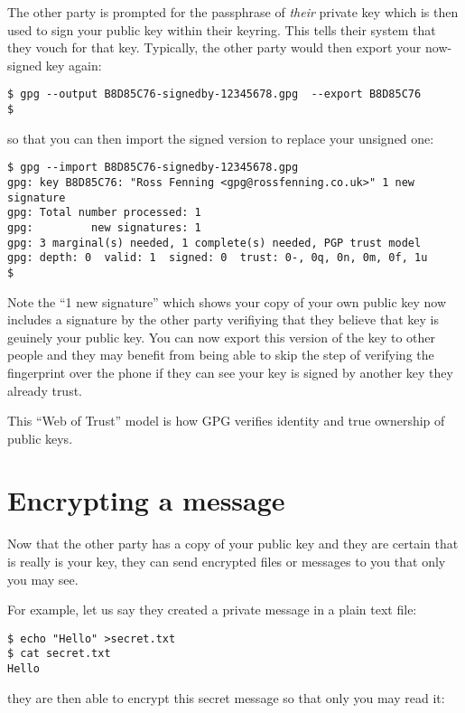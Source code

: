 \documentclass{report}
\begin{document}
The other party is prompted for the passphrase of \emph{their} private key
which is then used to sign your public key within their keyring. This
tells their system that they vouch for that key. Typically, the other
party would then export your now-signed key again:

\begin{lstlisting}
$ gpg --output B8D85C76-signedby-12345678.gpg  --export B8D85C76
$
\end{lstlisting}

\noindent so that you can then import the signed version to replace your
unsigned one:

\begin{lstlisting}
$ gpg --import B8D85C76-signedby-12345678.gpg
gpg: key B8D85C76: "Ross Fenning <gpg@rossfenning.co.uk>" 1 new signature
gpg: Total number processed: 1
gpg:         new signatures: 1
gpg: 3 marginal(s) needed, 1 complete(s) needed, PGP trust model
gpg: depth: 0  valid: 1  signed: 0  trust: 0-, 0q, 0n, 0m, 0f, 1u
$
\end{lstlisting}

Note the ``1 new signature'' which shows your copy of your own public key
now includes a signature by the other party verifiying that they
believe that key is geuinely your public key. You can now export this
version of the key to other people and they may benefit from being able
to skip the step of verifying the fingerprint over the phone if they
can see your key is signed by another key they already trust.

This ``Web of Trust'' model is how GPG verifies identity and true ownership
of public keys.

\section{Encrypting a message}

Now that the other party has a copy of your public key and they are certain
that is really is your key, they can send encrypted files or messages to
you that only you may see.

For example, let us say they created a private message in a plain text file:

\begin{lstlisting}
$ echo "Hello" >secret.txt
$ cat secret.txt 
Hello
\end{lstlisting}

\noindent they are then able to encrypt this secret message so that only you may read it:
\end{document}
